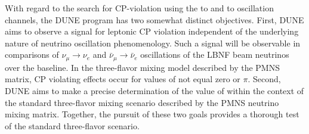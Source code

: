 With regard to the search for CP-violation using the \numu to \nue and
\anumu to \anue oscillation channels, the DUNE program has two
somewhat distinct objectives.  First, DUNE aims to observe a signal
for leptonic CP violation independent of the underlying nature of
neutrino oscillation phenomenology. Such a signal will be observable
in comparisons of $\nu_\mu \rightarrow \nu_e$ and $\bar{\nu}_{\mu}
\rightarrow \bar{\nu}_e$ oscillations of the LBNF beam neutrinos over
the  baseline. In the three-flavor mixing model
described by the PMNS matrix, CP violating effects occur for values
of \deltacp not equal zero or $\pi$. Second, DUNE aims to make a precise
determination of the value of \deltacp within the context of the
standard three-flavor mixing scenario described by the PMNS neutrino
mixing matrix. Together, the pursuit of these two goals provides a
thorough test of the standard three-flavor scenario.

